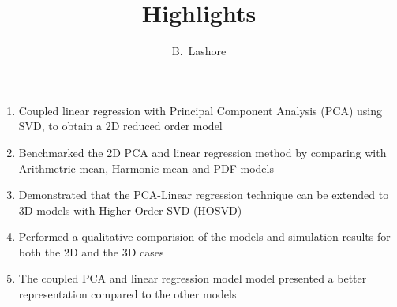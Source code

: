 \documentclass[a4paper,11pt]{article}
\author{B.~Lashore}
\title{Highlights}
\begin{document}
\maketitle

\begin{enumerate}
  \item Coupled linear regression with Principal Component Analysis (PCA) using SVD, to obtain a 2D reduced order model
  \item Benchmarked the 2D PCA and linear regression method by comparing with Arithmetric mean, Harmonic mean and PDF models
  \item Demonstrated that the PCA-Linear regression technique can be extended to 3D models with Higher Order SVD (HOSVD)
  \item Performed a qualitative comparision of the models and simulation results for both the 2D and the 3D cases
  \item The coupled PCA and linear regression model model presented a better representation compared to the other models
\end{enumerate}
\end{document}
